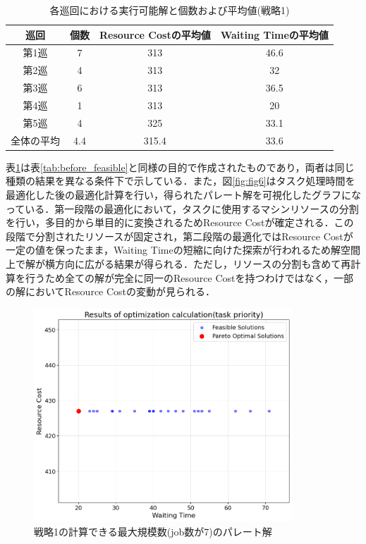 \begin{table}[ht]
    \centering
    \vspace{-0.3cm}
    \caption{各巡回における実行可能解と個数および平均値(戦略1)}
    \begin{tabular}{|c|c|c|c|}
        \hline
         巡回 & 個数 & Resource Costの平均値 & Waiting Timeの平均値 \\
        \hline
        第1巡 & 7 & 313 & 46.6 \\
        \hline
        第2巡 & 4 & 313 & 32 \\
        \hline
        第3巡 & 6 & 313 & 36.5 \\
        \hline
        第4巡 & 1 & 313 & 20 \\
        \hline
        第5巡 & 4 & 325 & 33.1 \\
        \hline
        全体の平均 & 4.4 & 315.4 & 33.6 \\
        \hline
    \end{tabular}
    \label{tab:task_feasible}
\end{table}

表\ref{tab:task_feasible}は表\ref{tab:before_feasible}と同様の目的で作成されたものであり，両者は同じ種類の結果を異なる条件下で示している．また，図\ref{fig:fig6}はタスク処理時間を最適化した後の最適化計算を行い，得られたパレート解を可視化したグラフになっている．第一段階の最適化において，タスクに使用するマシンリソースの分割を行い，多目的から単目的に変換されるためResource Costが確定される．この段階で分割されたリソースが固定され，第二段階の最適化ではResource Costが一定の値を保ったまま，Waiting Timeの短縮に向けた探索が行われるため解空間上で解が横方向に広がる結果が得られる．ただし，リソースの分割も含めて再計算を行うため全ての解が完全に同一のResource Costを持つわけではなく，一部の解においてResource Costの変動が見られる．

\begin{figure}[H]
    \centering
    \includegraphics[width=0.8\linewidth, height=8cm]{./images/task_job7.png}
    \caption{戦略1の計算できる最大規模数(job数が7)のパレート解}
    \label{fig:fig7}
\end{figure}
\clearpage

